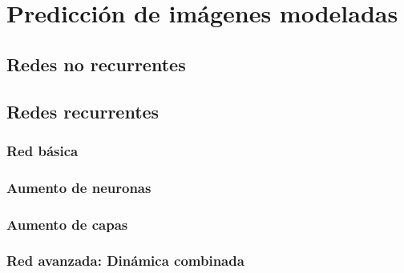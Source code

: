 \chapter{Predicción de imágenes modeladas}\label{cap.redes3dmod}

\section{Redes no recurrentes}

\section{Redes recurrentes}
\subsection{Red básica}
\subsection{Aumento de neuronas}
\subsection{Aumento de capas}
\subsection{Red avanzada: Dinámica combinada}
